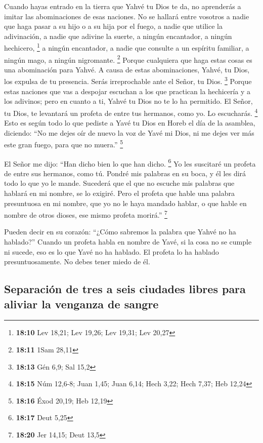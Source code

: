  Cuando hayas entrado en la tierra que Yahvé tu Dios te
da, no aprenderás a imitar las abominaciones de esas naciones.
 No se hallará entre vosotros a nadie que haga pasar a su
hijo o a su hija por el fuego, a nadie que utilice la adivinación, a
nadie que adivine la suerte, a ningún encantador, a ningún hechicero,
\footnote{\textbf{18:10} Lev 18,21; Lev 19,26; Lev 19,31; Lev 20,27}
 a ningún encantador, a nadie que consulte a un espíritu
familiar, a ningún mago, a ningún nigromante. \footnote{\textbf{18:11}
  1Sam 28,11}  Porque cualquiera que haga estas cosas es
una abominación para Yahvé. A causa de estas abominaciones, Yahvé, tu
Dios, los expulsa de tu presencia.  Serás irreprochable
ante el Señor, tu Dios. \footnote{\textbf{18:13} Gén 6,9; Sal 15,2}
 Porque estas naciones que vas a despojar escuchan a los
que practican la hechicería y a los adivinos; pero en cuanto a ti, Yahvé
tu Dios no te lo ha permitido.  El Señor, tu Dios, te
levantará un profeta de entre tus hermanos, como yo. Lo escucharás.
\footnote{\textbf{18:15} Núm 12,6-8; Juan 1,45; Juan 6,14; Hech 3,22;
  Hech 7,37; Heb 12,24}  Esto es según todo lo que
pediste a Yavé tu Dios en Horeb el día de la asamblea, diciendo: ``No me
dejes oír de nuevo la voz de Yavé mi Dios, ni me dejes ver más este gran
fuego, para que no muera.'' \footnote{\textbf{18:16} Éxod 20,19; Heb
  12,19}

 El Señor me dijo: ``Han dicho bien lo que han dicho.
\footnote{\textbf{18:17} Deut 5,25}  Yo les suscitaré un
profeta de entre sus hermanos, como tú. Pondré mis palabras en su boca,
y él les dirá todo lo que yo le mande.  Sucederá que el
que no escuche mis palabras que hablará en mi nombre, se lo exigiré.
 Pero el profeta que hable una palabra presuntuosa en mi
nombre, que yo no le haya mandado hablar, o que hable en nombre de otros
dioses, ese mismo profeta morirá.'' \footnote{\textbf{18:20} Jer 14,15;
  Deut 13,5}

 Pueden decir en su corazón: ``¿Cómo sabremos la palabra
que Yahvé no ha hablado?''  Cuando un profeta habla en
nombre de Yavé, si la cosa no se cumple ni sucede, eso es lo que Yavé no
ha hablado. El profeta lo ha hablado presuntuosamente. No debes tener
miedo de él.

\hypertarget{separaciuxf3n-de-tres-a-seis-ciudades-libres-para-aliviar-la-venganza-de-sangre}{%
\subsection{Separación de tres a seis ciudades libres para aliviar la
venganza de
sangre}\label{separaciuxf3n-de-tres-a-seis-ciudades-libres-para-aliviar-la-venganza-de-sangre}}

